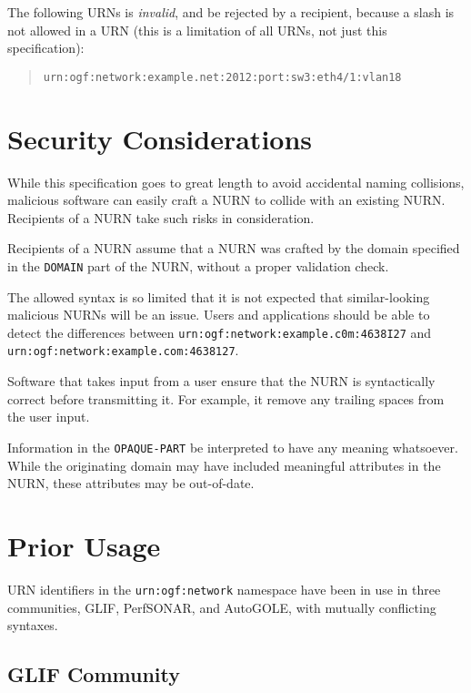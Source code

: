 \documentclass[12pt]{article}  %
\begin{document}
The following URNs is \emph{invalid}, and \SHOULD{} be rejected by a recipient, 
because a slash is not allowed in a URN (this is a limitation of all URNs, 
not just this specification):
\begin{quote}
\texttt{urn:ogf:network:example.net:2012:port:sw3:eth4/1:vlan18}
\end{quote}





\section{Security Considerations}

While this specification goes to great length to avoid accidental naming collisions,
malicious software can easily craft a NURN to collide with an existing NURN. 
Recipients of a NURN \MUST{} take such risks in consideration.

Recipients of a NURN \MUSTNOT{} assume that a NURN was crafted by the domain
specified in the \texttt{DOMAIN} part of the NURN, without a proper validation 
check.

The allowed syntax is so limited that it is not expected that similar-looking 
malicious NURNs will be an issue. Users and applications should be able to detect the 
differences between \texttt{urn:ogf:network:example.c0m:4638I27} 
and \texttt{urn:ogf:network:example.com:4638127}.

Software that takes input from a user \MUST{} ensure that the NURN is 
syntactically correct before transmitting it. For example, it \SHOULD{} remove any 
trailing spaces from the user input.

Information in the \texttt{OPAQUE-PART} \MUSTNOT{} be interpreted to have 
any meaning whatsoever. While the originating domain may have included 
meaningful attributes in the NURN, these attributes may be out-of-date.

\section{Prior Usage}

URN identifiers in the \texttt{urn:ogf:network} namespace have been in use in 
three communities, GLIF, PerfSONAR, and AutoGOLE, with mutually conflicting syntaxes.

\subsection{GLIF Community} %
\label{sec:glif}
\end{document}

